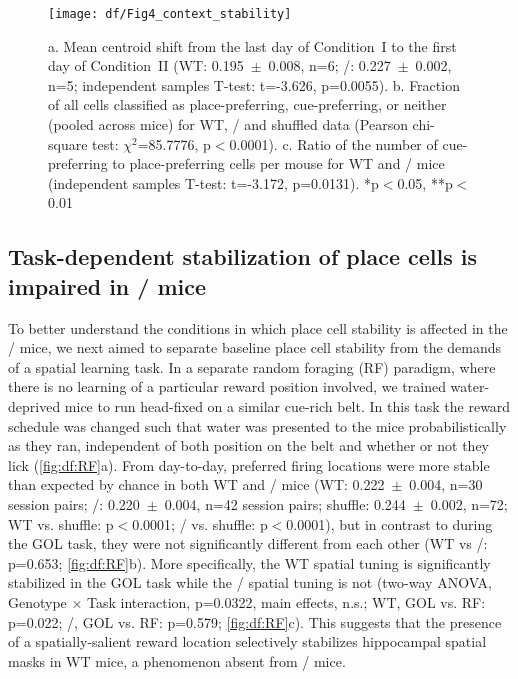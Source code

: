 \begin{figure}
	\centering
	\texttt{[image: df/Fig4\_context\_stability]}
	\caption[Subtle contextual change induces remapping in \df/ mice]{a. Mean centroid shift from the last day of Condition~I to the first day of Condition~II (WT: 0.195~$\pm$~0.008, n=6; \df/: 0.227~$\pm$~0.002, n=5; independent samples T-test: t=-3.626, p=0.0055).
	b. Fraction of all cells classified as place-preferring, cue-preferring, or neither (pooled across mice) for WT, \df/ and shuffled data (Pearson chi-square test: $\chi^2$=85.7776, p$<$0.0001).
	c. Ratio of the number of cue-preferring to place-preferring cells per mouse for WT and \df/ mice (independent samples T-test: t=-3.172, p=0.0131). *p$<$0.05, **p$<$0.01}
	\label{fig:df:context_stability}
\end{figure}

\subsection{Task-dependent stabilization of place cells is impaired in \df/ mice}
\label{sec:df:results:rf}
To better understand the conditions in which place cell stability is affected in the \df/ mice, we next aimed to separate baseline place cell stability from the demands of a spatial learning task.  In a separate random foraging (RF) paradigm, where there is no learning of a particular reward position involved, we trained water-deprived mice to run head-fixed on a similar cue-rich belt. In this task the reward schedule was changed such that water was presented to the mice probabilistically as they ran, independent of both position on the belt and whether or not they lick (\autoref{fig:df:RF}a). From day-to-day, preferred firing locations were more stable than expected by chance in both WT and \df/ mice (WT: 0.222~$\pm$~0.004, n=30 session pairs; \df/: 0.220~$\pm$~0.004, n=42 session pairs; shuffle: 0.244~$\pm$~0.002, n=72; WT vs. shuffle: p$<$0.0001; \df/ vs. shuffle: p$<$0.0001), but in contrast to during the GOL task, they were not significantly different from each other (WT vs \df/: p=0.653; \autoref{fig:df:RF}b). More specifically, the WT spatial tuning is significantly stabilized in the GOL task while the \df/ spatial tuning is not (two-way ANOVA, Genotype $\times$ Task interaction, p=0.0322, main effects, n.s.; WT, GOL vs. RF: p=0.022; \df/, GOL vs. RF: p=0.579; \autoref{fig:df:RF}c). This suggests that the presence of a spatially-salient reward location selectively stabilizes hippocampal spatial masks in WT mice, a phenomenon absent from \df/ mice.

